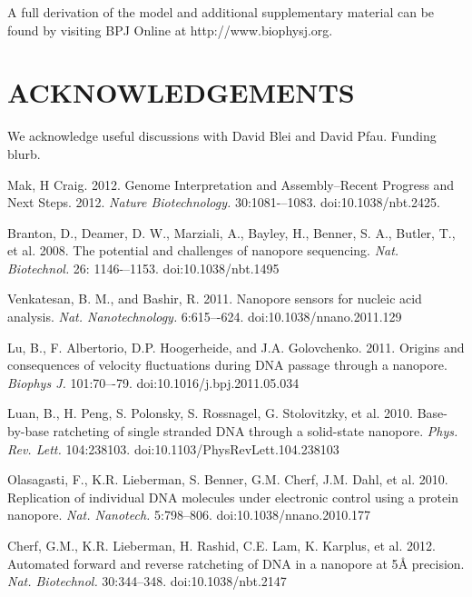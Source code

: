\documentclass{biophys_letter}
\begin{document}
A full derivation of the model and additional supplementary material can be found by visiting BPJ Online at http://www.biophysj.org.\vspace*{6pt}

\section*{ACKNOWLEDGEMENTS}

We acknowledge useful discussions with David Blei and David Pfau. Funding blurb.

\begin{thebibliography}{99}

  Mak, H Craig. 
  2012.
  Genome Interpretation and Assembly--Recent Progress and Next Steps.
  2012.
  {\it Nature Biotechnology.}
  30:1081-–1083.
  doi:10.1038/nbt.2425.

  Branton, D., Deamer, D. W., Marziali, A., Bayley, H., Benner, S. A., Butler, T., et al.
  2008.
  The potential and challenges of nanopore sequencing.
  {\it Nat. Biotechnol.}
  26: 1146-–1153.
  doi:10.1038/nbt.1495

  Venkatesan, B. M., and Bashir, R.
  2011.
  Nanopore sensors for nucleic acid analysis.
  {\it Nat. Nanotechnology.}
  6:615–-624.
  doi:10.1038/nnano.2011.129

  Lu, B., F. Albertorio, D.P. Hoogerheide, and J.A. Golovchenko.
  2011.
  Origins and consequences of velocity fluctuations during DNA passage through a nanopore.
  {\it Biophys J.}
  101:70–-79.
  doi:10.1016/j.bpj.2011.05.034

  Luan, B., H. Peng, S. Polonsky, S. Rossnagel, G. Stolovitzky, et al.
  2010.
  Base-by-base ratcheting of single stranded DNA through a solid-state nanopore.
  {\it Phys. Rev. Lett.}
  104:238103.
  doi:10.1103/PhysRevLett.104.238103

  Olasagasti, F., K.R. Lieberman, S. Benner, G.M. Cherf, J.M. Dahl, et al.
  2010.
  Replication of individual DNA molecules under electronic control using a protein nanopore.
  {\it Nat. Nanotech.}
  5:798–806.
  doi:10.1038/nnano.2010.177

  Cherf, G.M., K.R. Lieberman, H. Rashid, C.E. Lam, K. Karplus, et al.
  2012.
  Automated forward and reverse ratcheting of DNA in a nanopore at 5{\AA} precision.
  {\it Nat. Biotechnol.}
  30:344--348.
  doi:10.1038/nbt.2147


\end{thebibliography}
\end{document}
